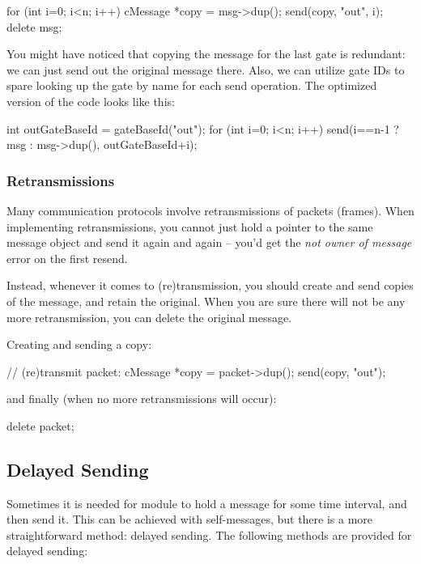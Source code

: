 \begin{cpp}
for (int i=0; i<n; i++)
{
    cMessage *copy = msg->dup();
    send(copy, "out", i);
}
delete msg;
\end{cpp}

You might have noticed that copying the message for the last gate is
redundant: we can just send out the original message there.
Also, we can utilize gate IDs to spare looking up the gate by name
for each send operation. The optimized version of the code looks
like this:

\begin{cpp}
int outGateBaseId = gateBaseId("out");
for (int i=0; i<n; i++)
    send(i==n-1 ? msg : msg->dup(), outGateBaseId+i);
\end{cpp}


\subsubsection{Retransmissions}

Many communication protocols involve retransmissions of packets (frames).
When implementing retransmissions, you cannot just hold a pointer
to the same message object and send it again and again -- you'd get
the \textit{not owner of message} error on the first resend.

Instead, whenever it comes to (re)transmission, you should create and
send copies of the message, and retain the original.
When you are sure there will not be any more retransmission,
you can delete the original message.

Creating and sending a copy:

\begin{cpp}
// (re)transmit packet:
cMessage *copy = packet->dup();
send(copy, "out");
\end{cpp}

and finally (when no more retransmissions will occur):

\begin{cpp}
delete packet;
\end{cpp}


\subsection{Delayed Sending}
\label{sec:simple-modules:delayed-sending}

Sometimes it is needed for module to hold a message for some time interval,
and then send it. This can be achieved with self-messages, but there is a
more straightforward method: delayed sending. The
following methods are provided for delayed sending:

